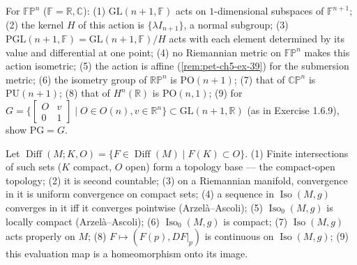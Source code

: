 \begin{remark}
  \label{rem:pet-ch5-ex-40}
  For $\mathbb{FP}^n$ ($\mathbb F=\mathbb R,\mathbb C$): (1) $\mathrm{GL}(n{+}1,
  \mathbb F)$ acts on $1$-dimensional subspaces of $\mathbb F^{n+1}$; (2) the
  kernel $H$ of this action is $\{\lambda I_{n+1}\}$, a normal subgroup; (3)
  $\mathrm{PGL}(n{+}1,\mathbb F)=\mathrm{GL}(n{+}1,\mathbb F)/H$ acts with each
  element determined by its value and differential at one point; (4) no
  Riemannian metric on $\mathbb{FP}^n$ makes this action isometric; (5) the action
  is affine (\cref{rem:pet-ch5-ex-39}) for the submersion metric; (6) the isometry
  group of $\mathbb{RP}^n$ is $\mathrm{PO}(n{+}1)$; (7) that of $\mathbb{CP}^n$ is
  $\mathrm{PU}(n{+}1)$; (8) that of $H^n(\mathbb R)$ is $\mathrm{PO}(n,1)$; (9) for
  $G=\{[\begin{smallmatrix}O&v\\0&1\end{smallmatrix}]\mid O\in O(n),v\in\mathbb R^n\}
  \subset\mathrm{GL}(n{+}1,\mathbb R)$ (as in Exercise 1.6.9), show $\mathrm{PG}=G$.
\end{remark}

\begin{remark}
  \label{rem:pet-ch5-ex-41}
  Let $\operatorname{Diff}(M;K,O)=\{F\in\operatorname{Diff}(M)\mid F(K)\subset O\}$.
  (1) Finite intersections of such sets ($K$ compact, $O$ open) form a topology
  base — the compact-open topology; (2) it is second countable; (3) on a
  Riemannian manifold, convergence in it is uniform convergence on compact sets;
  (4) a sequence in $\operatorname{Iso}(M,g)$ converges in it iff it converges
  pointwise (Arzelà–Ascoli); (5) $\operatorname{Iso}_0(M,g)$ is locally compact
  (Arzelà–Ascoli); (6) $\operatorname{Iso}_0(M,g)$ is compact; (7)
  $\operatorname{Iso}(M,g)$ acts properly on $M$; (8) $F\mapsto(F(p),DF|_p)$ is
  continuous on $\operatorname{Iso}(M,g)$; (9) this evaluation map is a
  homeomorphism onto its image.
\end{remark}

